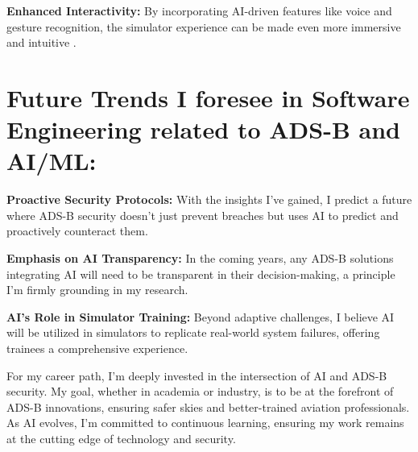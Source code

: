 \documentclass[11pt,journal,compsoc]{article}
\begin{document}
\textbf{Enhanced Interactivity:} By incorporating AI-driven features like voice and gesture recognition, the simulator experience can be made even more immersive and intuitive \cite{ref2,ref3}.

\section{Future Trends I foresee in Software Engineering related to ADS-B and AI/ML:}

\textbf{Proactive Security Protocols:} With the insights I've gained, I predict a future where ADS-B security doesn't just prevent breaches but uses AI to predict and proactively counteract them.

\textbf{Emphasis on AI Transparency:} In the coming years, any ADS-B solutions integrating AI will need to be transparent in their decision-making, a principle I'm firmly grounding in my research.

\textbf{AI's Role in Simulator Training:} Beyond adaptive challenges, I believe AI will be utilized in simulators to replicate real-world system failures, offering trainees a comprehensive experience.

For my career path, I'm deeply invested in the intersection of AI and ADS-B security. My goal, whether in academia or industry, is to be at the forefront of ADS-B innovations, ensuring safer skies and better-trained aviation professionals. As AI evolves, I'm committed to continuous learning, ensuring my work remains at the cutting edge of technology and security.



\end{document}
